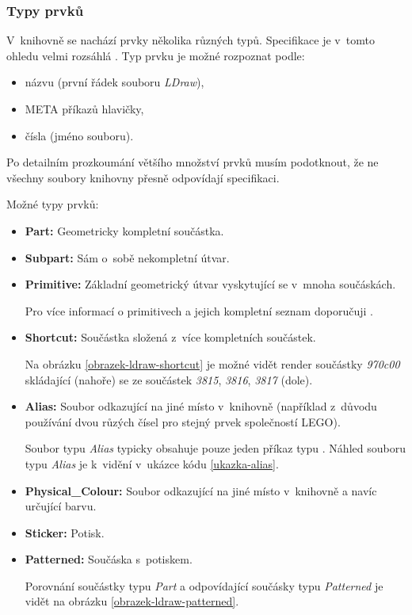     \subsubsection{Typy prvků}\label{ldraw-typy-soucastek}
    V~knihovně se nachází prvky několika různých typů. Specifikace je v~tomto ohledu velmi rozsáhlá \autocite{ldraw:header:specification}\autocite{ldraw:sticker:specification}. Typ prvku je možné rozpoznat podle: 
    \begin{itemize}
        \item názvu (první řádek souboru \textit{LDraw}),
        \item META příkazů hlavičky,
        \item čísla (jméno souboru).
    \end{itemize}
    
    Po detailním prozkoumání většího množství prvků musím podotknout, že ne všechny soubory knihovny přesně odpovídají specifikaci. 

    Možné typy prvků:
    
    \begin{itemize}
        \item \textbf{Part:} Geometricky kompletní součástka.
        \item \textbf{Subpart:} Sám o~sobě nekompletní útvar.
        \item \textbf{Primitive:} Základní geometrický útvar vyskytující se v~mnoha součáskách.

        Pro více informací o primitivech a jejich kompletní seznam doporučuji \autocite{ldraw:primitives}.

        \item \textbf{Shortcut:} Součástka složená z~více kompletních součástek.

        Na obrázku \ref{obrazek-ldraw-shortcut} je možné vidět render součástky \textit{970c00} skládající (nahoře) se ze součástek \textit{3815}, \textit{3816}, \textit{3817} (dole).

        \item \textbf{Alias:} Soubor odkazující na jiné místo v~knihovně (například z~důvodu používání dvou růzých čísel pro stejný prvek společností LEGO). 
        
        Soubor typu \textit{Alias} typicky obsahuje pouze jeden příkaz typu . Náhled souboru typu \textit{Alias} je k~vidění v~ukázce kódu \ref{ukazka-alias}.

        \item \textbf{Physical\_Colour:} Soubor odkazující na jiné místo v~knihovně a navíc určující barvu.
        \item \textbf{Sticker:} Potisk.
        \item \textbf{Patterned:} Součáska s~potiskem.
        
        Porovnání součástky typu \textit{Part} a odpovídající součásky typu \textit{Patterned} je vidět na obrázku \ref{obrazek-ldraw-patterned}.
        
    \end{itemize}
   
